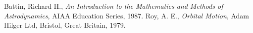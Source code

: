 \documentclass[12pt]{article}
\begin{document}
\begin{thebibliography}{9}
Battin, Richard H., {\it An Introduction to the Mathematics and Methods of Astrodynamics}, AIAA Education Series, 1987.
Roy, A. E., {\it Orbital Motion}, Adam Hilger Ltd, Bristol, Great Britain, 1979.
\end{thebibliography}
\end{document}
